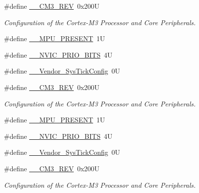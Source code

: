 \begin{DoxyCompactItemize}
\item 
\#define \hyperlink{group___configuration__section__for___c_m_s_i_s_gac6a3f185c4640e06443c18b3c8d93f53}{\-\_\-\-\_\-\-C\-M3\-\_\-\-R\-E\-V}~0x200\-U
\begin{DoxyCompactList}\small\item\em Configuration of the Cortex-\/\-M3 Processor and Core Peripherals. \end{DoxyCompactList}\item 
\#define \hyperlink{group___configuration__section__for___c_m_s_i_s_ga4127d1b31aaf336fab3d7329d117f448}{\-\_\-\-\_\-\-M\-P\-U\-\_\-\-P\-R\-E\-S\-E\-N\-T}~1\-U
\item 
\#define \hyperlink{group___configuration__section__for___c_m_s_i_s_gae3fe3587d5100c787e02102ce3944460}{\-\_\-\-\_\-\-N\-V\-I\-C\-\_\-\-P\-R\-I\-O\-\_\-\-B\-I\-T\-S}~4\-U
\item 
\#define \hyperlink{group___configuration__section__for___c_m_s_i_s_gab58771b4ec03f9bdddc84770f7c95c68}{\-\_\-\-\_\-\-Vendor\-\_\-\-Sys\-Tick\-Config}~0\-U
\item 
\#define \hyperlink{group___configuration__section__for___c_m_s_i_s_gac6a3f185c4640e06443c18b3c8d93f53}{\-\_\-\-\_\-\-C\-M3\-\_\-\-R\-E\-V}~0x200\-U
\begin{DoxyCompactList}\small\item\em Configuration of the Cortex-\/\-M3 Processor and Core Peripherals. \end{DoxyCompactList}\item 
\#define \hyperlink{group___configuration__section__for___c_m_s_i_s_ga4127d1b31aaf336fab3d7329d117f448}{\-\_\-\-\_\-\-M\-P\-U\-\_\-\-P\-R\-E\-S\-E\-N\-T}~1\-U
\item 
\#define \hyperlink{group___configuration__section__for___c_m_s_i_s_gae3fe3587d5100c787e02102ce3944460}{\-\_\-\-\_\-\-N\-V\-I\-C\-\_\-\-P\-R\-I\-O\-\_\-\-B\-I\-T\-S}~4\-U
\item 
\#define \hyperlink{group___configuration__section__for___c_m_s_i_s_gab58771b4ec03f9bdddc84770f7c95c68}{\-\_\-\-\_\-\-Vendor\-\_\-\-Sys\-Tick\-Config}~0\-U
\item 
\#define \hyperlink{group___configuration__section__for___c_m_s_i_s_gac6a3f185c4640e06443c18b3c8d93f53}{\-\_\-\-\_\-\-C\-M3\-\_\-\-R\-E\-V}~0x200\-U
\begin{DoxyCompactList}\small\item\em Configuration of the Cortex-\/\-M3 Processor and Core Peripherals. \end{DoxyCompactList}\item 

\end{DoxyCompactItemize}
